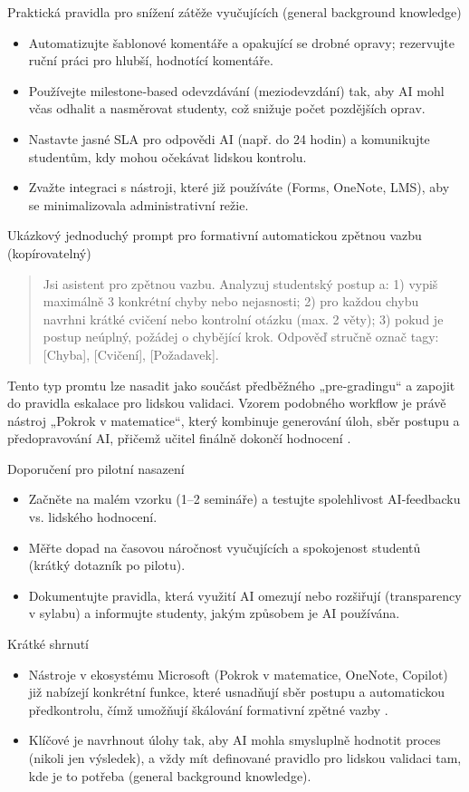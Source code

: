 Praktická pravidla pro snížení zátěže vyučujících (general background knowledge)
\begin{itemize}
  \item Automatizujte šablonové komentáře a opakující se drobné opravy; rezervujte ruční práci pro hlubší, hodnotící komentáře.
  \item Používejte milestone‑based odevzdávání (meziodevzdání) tak, aby AI mohl včas odhalit a nasměrovat studenty, což snižuje počet pozdějších oprav.
  \item Nastavte jasné SLA pro odpovědi AI (např. do 24 hodin) a komunikujte studentům, kdy mohou očekávat lidskou kontrolu.
  \item Zvažte integraci s nástroji, které již používáte (Forms, OneNote, LMS), aby se minimalizovala administrativní režie.
\end{itemize}

Ukázkový jednoduchý prompt pro formativní automatickou zpětnou vazbu (kopírovatelný)
\begin{quote}
\begin{PromptBlock}

Jsi asistent pro zpětnou vazbu. Analyzuj studentský postup a: 1) vypiš maximálně 3 konkrétní chyby nebo nejasnosti; 2) pro každou chybu navrhni krátké cvičení nebo kontrolní otázku (max. 2 věty); 3) pokud je postup neúplný, požádej o chybějící krok. Odpověď stručně označ tagy: [Chyba], [Cvičení], [Požadavek].
\end{PromptBlock}

\end{quote}
Tento typ promtu lze nasadit jako součást předběžného „pre‑gradingu“ a zapojit do pravidla eskalace pro lidskou validaci. Vzorem podobného workflow je právě nástroj „Pokrok v matematice“, který kombinuje generování úloh, sběr postupu a předopravování AI, přičemž učitel finálně dokončí hodnocení \cite{kb_ai_101_tipu_pdf_04e4a115_page_8_1}.

Doporučení pro pilotní nasazení
\begin{itemize}
  \item Začněte na malém vzorku (1–2 semináře) a testujte spolehlivost AI‑feedbacku vs. lidského hodnocení.
  \item Měřte dopad na časovou náročnost vyučujících a spokojenost studentů (krátký dotazník po pilotu).
  \item Dokumentujte pravidla, která využití AI omezují nebo rozšiřují (transparency v sylabu) a informujte studenty, jakým způsobem je AI používána.
\end{itemize}

Krátké shrnutí
\begin{itemize}
  \item Nástroje v ekosystému Microsoft (Pokrok v matematice, OneNote, Copilot) již nabízejí konkrétní funkce, které usnadňují sběr postupu a automatickou předkontrolu, čímž umožňují škálování formativní zpětné vazby \cite{kb_ai_101_tipu_pdf_04e4a115_page_8_1,kb_ai_101_tipu_pdf_04e4a115_page_3_1}.
  \item Klíčové je navrhnout úlohy tak, aby AI mohla smysluplně hodnotit proces (nikoli jen výsledek), a vždy mít definované pravidlo pro lidskou validaci tam, kde je to potřeba (general background knowledge).
\end{itemize}